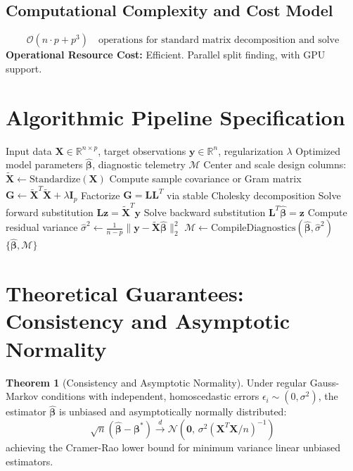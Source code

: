 \documentclass[11pt,a4paper]{article}
\theoremstyle{definition}
\newtheorem{theorem}{\textbf{Theorem}}[section]
\begin{document}
\subsection{Computational Complexity and Cost Model}
\begin{equation}
\mathcal{O}(n \cdot p + p^3) \quad \text{operations for standard matrix decomposition and solve}
\end{equation}
\textbf{Operational Resource Cost:} Efficient. Parallel split finding, with GPU support.

\section{Algorithmic Pipeline Specification}

\begin{algorithm}[H]
\caption{XGBoost Execution}
\begin{algorithmic}[1]
\Require Input data $\mathbf{X} \in \mathbb{R}^{n \times p}$, target observations $\mathbf{y} \in \mathbb{R}^n$, regularization $\lambda$
\Ensure Optimized model parameters $\hat{\boldsymbol{\beta}}$, diagnostic telemetry $\mathcal{M}$
\State Center and scale design columns: $\tilde{\mathbf{X}} \gets \text{Standardize}(\mathbf{X})$
\State Compute sample covariance or Gram matrix $\mathbf{G} \gets \tilde{\mathbf{X}}^T \tilde{\mathbf{X}} + \lambda \mathbf{I}_p$
\State Factorize $\mathbf{G} = \mathbf{L} \mathbf{L}^T$ via stable Cholesky decomposition
\State Solve forward substitution $\mathbf{L} \mathbf{z} = \tilde{\mathbf{X}}^T \mathbf{y}$
\State Solve backward substitution $\mathbf{L}^T \hat{\boldsymbol{\beta}} = \mathbf{z}$
\State Compute residual variance $\hat{\sigma}^2 \gets \frac{1}{n - p} \| \mathbf{y} - \tilde{\mathbf{X}} \hat{\boldsymbol{\beta}} \|_2^2$
\State $\mathcal{M} \gets \text{CompileDiagnostics}(\hat{\boldsymbol{\beta}}, \hat{\sigma}^2)$
\State \Return $\{\hat{\boldsymbol{\beta}}, \mathcal{M}\}$
\end{algorithmic}
\end{algorithm}

\section{Theoretical Guarantees: Consistency and Asymptotic Normality}

\begin{theorem}[Consistency and Asymptotic Normality]
Under regular Gauss-Markov conditions with independent, homoscedastic errors $\epsilon_i \sim (0, \sigma^2)$, the estimator $\hat{\boldsymbol{\beta}}$ is unbiased and asymptotically normally distributed:
\begin{equation}
\sqrt{n}(\hat{\boldsymbol{\beta}} - \boldsymbol{\beta}^*) \xrightarrow{d} \mathcal{N}\left(\mathbf{0}, \, \sigma^2 (\mathbf{X}^T \mathbf{X} / n)^{-1}\right)
\end{equation}
achieving the Cramer-Rao lower bound for minimum variance linear unbiased estimators.
\end{theorem}
\end{document}
